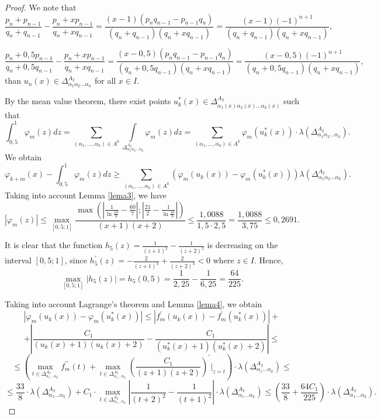 \documentclass[11pt]{amsart}
\theoremstyle{plain}
\theoremstyle{remark}
\begin{document}
\begin{proof}
We note that
$$\frac{p_{n}+p_{n-1}}{q_{n}+q_{n-1}}-\frac{p_{n}+xp_{n-1}}{q_{n}+xq_{n-1}}=\frac{(x-1)(p_{n}q_{n-1}-p_{n-1}q_{n})}{(q_{n}+q_{n-1})(q_{n}+xq_{n-1})}=
\frac{(x-1)(-1)^{n+1}}{(q_{n}+q_{n-1})(q_{n}+xq_{n-1})},$$

$$\frac{p_{n}+0,5p_{n-1}}{q_{n}+0,5q_{n-1}}-\frac{p_{n}+xp_{n-1}}{q_{n}+xq_{n-1}}=\frac{(x-0,5)(p_{n}q_{n-1}-p_{n-1}q_{n})}{(q_{n}+0,5q_{n-1})(q_{n}+xq_{n-1})}=
\frac{(x-0,5)(-1)^{n+1}}{(q_{n}+0,5q_{n-1})(q_{n}+xq_{n-1})},$$
than $u_{n}(x) \in \Delta^{A_2}_{\alpha_1\alpha_2...\alpha_n}$    for all $x \in I$.

By the mean value theorem, there exist points $u^{*}_{k}(x)\in\Delta^{A_2}_{\alpha_1(x)\alpha_2(x)...\alpha_k(x)}$ such that
$$
\int_{0,5}^{1}\varphi_m(z)dz=\sum\limits_{(\alpha_1,...,\alpha_k)\in A^k}\int\limits_{\Delta^{A_2}_{\alpha_1\alpha_2...\alpha_k}}\varphi_m(z)dz=
\sum\limits_{(\alpha_1,...,\alpha_k)\in A^k}\varphi_m(u_{k}^*(x))\cdot\lambda(\Delta^{A_2}_{\alpha_1\alpha_2...\alpha_k}).
$$
We obtain
$$
\varphi_{k+m}(x)-\int_{0,5}^{1}\varphi_m(z)dz\geq\sum\limits_{(\alpha_1,...,\alpha_k)\in A^k}(\varphi_m(u_{k}(x))-\varphi_m(u_{k}^{*}(x)))\lambda(\Delta^{A_2}_{\alpha_1\alpha_2...\alpha_k}).
$$
Taking into account Lemma \ref{lema3}, we have
$$
\left|\varphi_m(z)\right|\leq\max_{[0,5;1]}\frac{
\max\left(|\frac{1}{\ln\frac{10}{9}}-\frac{60}{7}|;|\frac{21}{2}-\frac{1}{\ln\frac{10}{9} }|\right)}{(x+1)(x+2)} \leq   \frac{1,0088}{1,5\cdot2,5}=\frac{1,0088}{3,75}\leq 0,2691.
$$

It is clear that the function $h_5(z)=\frac{1}{(z+1)^2}-\frac{1}{(z+2)^2}$ is decreasing on the interval $[0,5;1]$, since $h_5^\prime(z)=-\frac{2}{(z+1)^3}+\frac{2}{(z+2)^3}<0$ where $z\in I.$
Hence,
 $$\max_{[0,5;1]}\left|h_5(z)\right|=h_5(0,5)=\frac{1}{2,25}-\frac{1}{6,25}=\frac{64}{225}.$$

Taking into account Lagrange's theorem and Lemma \ref{lema4}, we obtain
$$
\left|\varphi_m(u_k(x))-\varphi_m(u_k^{*}(x))\right| \leq\left|f_m^\prime(u_k(x))-f_m^\prime(u_k^{*}(x))\right|+
$$
$$
+\left|\frac{C_1}{(u_k(x)+1)(u_k(x)+2)}-\frac{C_1}{(u_k^{*}(x)+1)(u_k^{*}(x)+2)}\right|\leq
$$
$$
\leq\left(\max_{t\in\Delta^{A_2}_{\alpha_1...\alpha_k}}f_m^{\prime\prime}(t)+
\max_{t\in\Delta^{A_2}_{\alpha_1...\alpha_k}}\left(\frac{C_1}{(z+1)(z+2)}\right)^\prime\Bigg|_{z=t}\right)
\cdot\lambda(\Delta^{A_2}_{\alpha_1...\alpha_k})\leq
$$
$$\leq    \frac{33}{8}\cdot\lambda(\Delta^{A_2}_{\alpha_1...\alpha_k})+C_1\cdot\max_{t\in\Delta^{A_2}_{\alpha_1...\alpha_k}}
\left|\frac{1}{(t+2)^2}-\frac{1}{(t+1)^2}\right|\cdot\lambda(\Delta^{A_2}_{\alpha_1...\alpha_k})
\leq\left(\frac{33}{8}+\frac{64C_1}{225}\right)
\cdot\lambda(\Delta^{A_2}_{\alpha_1...\alpha_k}).$$


\end{proof}
\end{document}
